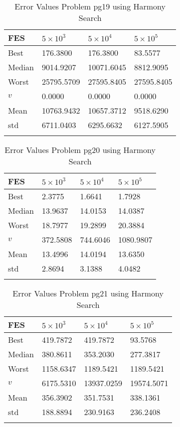 \documentclass[10pt, a4paper]{book}
\begin{document}
\begin{center}
\begin{longtable}{l l l l}
FES & $5 \times 10^{3}$ & $5 \times 10^{4}$ & $5 \times 10^{5}$ \\
\hline
Best & 176.3800 & 176.3800 & 83.5577 \\
Median & 9014.9207 & 10071.6045 & 8812.9095 \\
Worst & 25795.5709 & 27595.8405 & 27595.8405 \\
$v$ & 0.0000 & 0.0000 & 0.0000 \\
Mean & 10763.9432 & 10657.3712 & 9518.6290 \\
std & 6711.0403 & 6295.6632 & 6127.5905 \\
\caption{ Error Values Problem pg19 using Harmony Search }
\end{longtable}
\end{center}

\begin{center}
\begin{longtable}{l l l l}
FES & $5 \times 10^{3}$ & $5 \times 10^{4}$ & $5 \times 10^{5}$ \\
\hline
Best & 2.3775 & 1.6641 & 1.7928 \\
Median & 13.9637 & 14.0153 & 14.0387 \\
Worst & 18.7977 & 19.2899 & 20.3884 \\
$v$ & 372.5808 & 744.6046 & 1080.9807 \\
Mean & 13.4996 & 14.0194 & 13.6350 \\
std & 2.8694 & 3.1388 & 4.0482 \\
\caption{ Error Values Problem pg20 using Harmony Search }
\end{longtable}
\end{center}

\begin{center}
\begin{longtable}{l l l l}
FES & $5 \times 10^{3}$ & $5 \times 10^{4}$ & $5 \times 10^{5}$ \\
\hline
Best & 419.7872 & 419.7872 & 93.5768 \\
Median & 380.8611 & 353.2030 & 277.3817 \\
Worst & 1158.6347 & 1189.5421 & 1189.5421 \\
$v$ & 6175.5310 & 13937.0259 & 19574.5071 \\
Mean & 356.3902 & 351.7531 & 338.1361 \\
std & 188.8894 & 230.9163 & 236.2408 \\
\caption{ Error Values Problem pg21 using Harmony Search }
\end{longtable}
\end{center}
\end{document}
